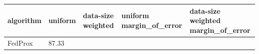 \begin{tabular}{lllll}
\toprule
algorithm & uniform & data-size weighted & uniform margin_of_error & data-size weighted margin_of_error \\
\midrule
FedProx & 87.33%
\bottomrule
\end{tabular}
